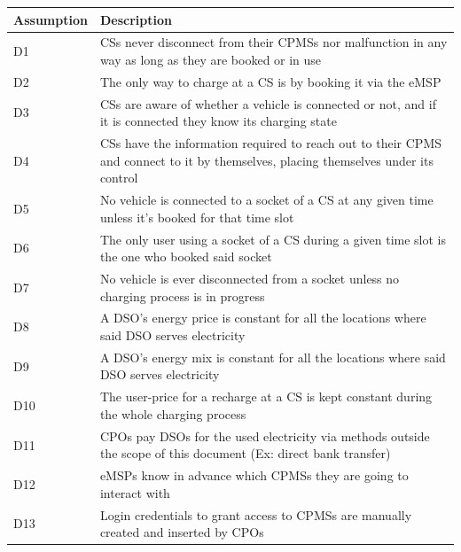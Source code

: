\documentclass[11pt]{article}
\begin{document}
\begin{table}[H]
    \centering
    \setlength{\tabcolsep}{18pt}
    \renewcommand{\arraystretch}{1.2}
    \begin{tabularx}{\textwidth}{|>{\centering\hsize=0.3\hsize}X|>{\hsize=1.7\hsize}X|}
        \hline
        \textbf{Assumption} & \textbf{Description} \\
        \hline
        D1 & CSs never disconnect from their CPMSs nor malfunction in any way as long as they are booked or in use \\
        \hline
        D2 & The only way to charge at a CS is by booking it via the eMSP \\
        \hline
        D3 & CSs are aware of whether a vehicle is connected or not, and if it is connected they know its charging state \\
        \hline
        D4 & CSs have the information required to reach out to their CPMS and connect to it by themselves, placing themselves under its control \\
        \hline
        D5 & No vehicle is connected to a socket of a CS at any given time unless it's booked for that time slot \\
        \hline
        D6 & The only user using a socket of a CS during a given time slot is the one who booked said socket \\
        \hline
        D7 & No vehicle is ever disconnected from a socket unless no charging process is in progress \\
        \hline
        D8 & A DSO's energy price is constant for all the locations where said DSO serves electricity \\
        \hline
        D9 & A DSO's energy mix is constant for all the locations where said DSO serves electricity \\
        \hline
        D10 & The user-price for a recharge at a CS is kept constant during the whole charging process \\
        \hline
        D11 & CPOs pay DSOs for the used electricity via methods outside the scope of this document (Ex: direct bank transfer) \\
        \hline
        D12 & eMSPs know in advance which CPMSs they are going to interact with \\
        \hline
        D13 & Login credentials to grant access to CPMSs are manually created and inserted by CPOs \\
        \hline
    \end{tabularx}
    \label{tab:domain_assumptions}
\end{table}
\end{document}
